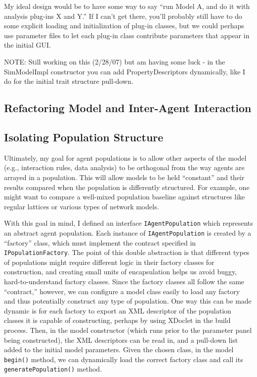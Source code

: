 \documentclass[noid]{kluwer-mem-proposal}
\begin{document}
\begin{article}
My ideal design would be to have some way to say ``run Model A, and do it with
analysis plug-ins X and Y.''  If I can't get there, you'll probably still have
to do some explicit loading and initialization of plug-in classes, but we could
perhaps use parameter files to let each plug-in class contribute parameters that
appear in the initial GUI.  

NOTE:  Still working on this (2/28/07) but am having some luck - in the
SimModelImpl constructor you can add PropertyDescriptors dynamically, like I do
for the initial trait structure pull-down.

\subsection{Refactoring Model and Inter-Agent Interaction}

\subsection{Isolating Population Structure}
Ultimately, my goal for agent populations is to allow other aspects of the model
(e.g., interaction rules, data analysis) to be orthogonal from the way agents
are arrayed in a population.  This will allow models to be held ``constant'' and
their results compared when the population is differently structured.  For
example, one might want to compare a well-mixed population baseline against
structures like regular lattices or various types of network models.  

With this goal in mind, I defined an interface \texttt{IAgentPopulation} which
represents an abstract agent population.  Each instance of
\texttt{IAgentPopulation} is created by a ``factory'' class, which must
implement the contract specified in \texttt{IPopulationFactory}.  The point of
this double abstraction is that different types of populations might require
different logic in their factory classes for construction, and creating small
units of encapsulation helps us avoid buggy, hard-to-understand factory classes.
 Since the factory classes all follow the same ``contract,'' however, we can
 configure a model class easily to load any factory and thus potentially
 construct any type of population.  One way this can be made dynamic is for each
 factory to export an XML descriptor of the population classes it is capable of
 constructing, perhaps by using XDoclet in the build process.  Then, in the
 model constructor (which runs prior to the parameter panel being constructed),
 the XML descriptors can be read in, and a pull-down list added to the initial
 model parameters.  Given the chosen class, in the model \texttt{begin()}
 method, we can dynamically load the correct factory class and call its
 \texttt{generatePopulation()} method.  
 

\end{article}
\end{document}
